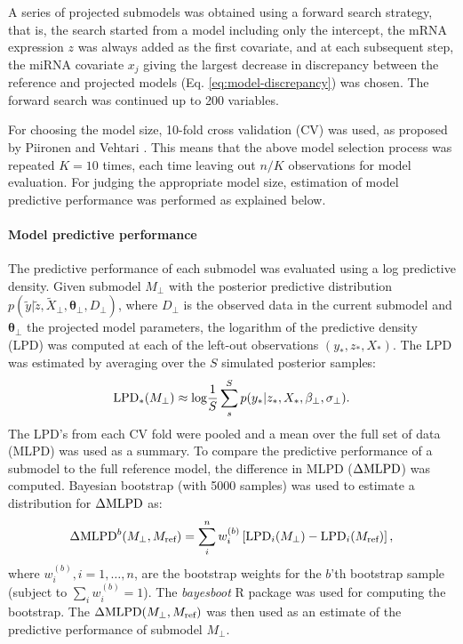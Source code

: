 A series of projected submodels was obtained using a
forward search strategy, that is, the search started from a model including
only the intercept, the mRNA expression $z$ was always added as the first
covariate, and at each subsequent step, the miRNA covariate $x_j$ giving the
largest decrease in discrepancy between the reference and projected models 
(Eq. \eqref{eq:model-discrepancy}) was
chosen. The forward search was continued up to 200 variables.

For choosing the model size, 10-fold cross validation (CV) was used, as proposed by
Piironen and Vehtari \citep{Piironen2016}. This means that the above model selection
process was repeated $K=10$ times, each time leaving out $n/K$ observations for
model evaluation. For judging the appropriate model size, estimation of model
predictive performance was performed as explained below.

\paragraph{Model predictive performance}
The predictive performance of each submodel was evaluated using 
a log predictive density.
Given submodel $M_\perp$ with the posterior predictive distribution
$p(\tilde{y}| \tilde{z}, \tilde{X}_\perp, \mathbf{\theta}_\perp, D_\perp)$,
where $D_\perp$ is the observed data in the current submodel and
$\mathbf{\theta}_\perp$ the projected model parameters, the logarithm of the predictive density
(LPD) was computed at each of the left-out observations $(y_*, z_*, X_*)$.
The LPD was estimated by averaging over the $S$ simulated posterior samples:
\[
	\textup{LPD}_*(M_\perp) \approx \textup{log}\frac{1}{S} \sum_s^S p(y_*| z_*, X_*, \mathbf{\beta}_\perp, \sigma_\perp).
\]
The LPD's from each CV fold were pooled and a mean over the full set of data
(MLPD) was used as a summary. To compare the predictive performance of a
submodel to the full reference model, the difference in MLPD ($\Delta \textup{MLPD}$) was
computed. Bayesian bootstrap \citep{Rubin1981} (with 5000 samples) was used to estimate a
distribution for $\Delta \textup{MLPD}$ as:
\[
	\Delta \textup{MLPD}^{b}(M_\perp,M_{\textup{ref}}) = \sum_i^n w_i^{(b)} \left [ \textup{LPD}_i(M_\perp) - \textup{LPD}_i(M_{\textup{ref}}) \right ],
\]
where $w_i^{(b)}, i = 1, \dotsc,n$, are the bootstrap weights
for the $b$'th bootstrap sample (subject to $\sum_i w_i^{(b)} = 1$).
The \emph{bayesboot} R package was used for computing the bootstrap.
The $\Delta \textup{MLPD}(M_\perp,M_{\textup{ref}})$ was then used
as an estimate of the predictive performance of submodel $M_\perp$.

